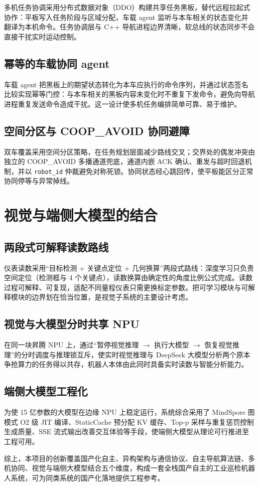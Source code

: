 多机任务协调采用分布式数据对象（DDO）构建共享任务黑板，替代远程拉起式协作：平板写入任务阶段与区域分配，车载 agent 监听与本车相关的状态变化并翻译为本机命令。任务协调层与 C++ 导航进程边界清晰，软总线的状态同步不会直接干扰实时运动控制。

\subsection{幂等的车载协同 agent}
\label{sec:reconciler-agent}

车载 agent 把黑板上的期望状态转化为本车应执行的命令序列，并通过状态签名比较实现幂等门控：与本车相关的黑板内容未变化时不重复下发命令，避免向导航进程重复发送命令造成干扰。这一设计使多机任务编排简单可靠、易于维护。

\subsection{空间分区与 COOP\_AVOID 协同避障}
\label{sec:spatial-coop}

双车覆盖采用空间分区策略，在任务规划层面减少路线交叉；交界处的偶发冲突由独立的 COOP\_AVOID 多播通道兜底，通道内嵌 ACK 确认、重发与超时回退机制，并以 \texttt{robot\_id} 仲裁避免对称死锁。协同状态经心跳回传，使平板能区分正常协同停等与异常掉线。

\section{视觉与端侧大模型的结合}
\label{sec:vision-llm-innovations}

\subsection{两段式可解释读数路线}
\label{sec:interpretable-reading}

仪表读数采用“目标检测 + 关键点定位 + 几何换算”两段式路线：深度学习只负责空间定位（检测框与 4 个关键点），读数换算由确定性的角度比例公式完成。读数过程可解释、可复现，适配不同量程仪表只需更换标定参数。把可学习模块与可解释模块的边界划在恰当位置，是视觉子系统的主要设计考虑。

\subsection{视觉与大模型分时共享 NPU}
\label{sec:npu-time-sharing}

在同一块昇腾 NPU 上，通过“暂停视觉推理 $\to$ 执行大模型 $\to$ 恢复视觉推理”的分时调度与推理锁互斥，使实时视觉推理与 DeepSeek 大模型分析两个原本争抢算力的任务得以共存，机器人本体由此同时具备实时读数与智能分析能力。

\subsection{端侧大模型工程化}
\label{sec:edge-llm-engineering}

为使 15 亿参数的大模型在边缘 NPU 上稳定运行，系统综合采用了 MindSpore 图模式 O2 级 JIT 编译、StaticCache 预分配 KV 缓存、Top-p 采样与重复惩罚控制生成质量、SSE 流式输出改善交互体验等手段，使端侧大模型从理论可行推进至工程可用。

综上，本项目的创新覆盖国产化自主、异构架构与通信协议、自主导航算法链、多机协同、视觉与端侧大模型结合五个维度，构成一套全栈国产自主的工业巡检机器人系统，可为同类系统的国产化落地提供工程参考。
